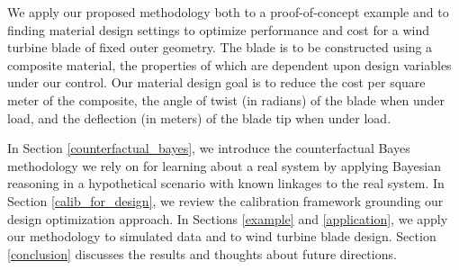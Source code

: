\documentclass[12pt]{article}
\begin{document}
%
We apply our proposed methodology both to a proof-of-concept example and to finding material design settings to optimize performance and cost for a wind turbine blade of fixed outer geometry.
%
The blade is to be constructed using a composite material, the properties of which are dependent upon design variables under our control.
%
%
Our material design goal is to reduce the cost per square meter of the composite, the angle of twist (in radians) of the blade when under load, and the deflection (in meters) of the blade tip when under load.
%

%
In Section \ref{counterfactual_bayes}, we introduce the counterfactual Bayes methodology we rely on for learning about a real system by applying Bayesian reasoning in a hypothetical scenario with known linkages to the real system.
%
In Section \ref{calib_for_design}, we review the calibration framework grounding our design optimization approach. 
%
In Sections \ref{example} and \ref{application}, we apply our methodology to simulated data and to wind turbine blade design.
%
%
Section \ref{conclusion} discusses the results and thoughts about future directions.
%

%
\end{document}
